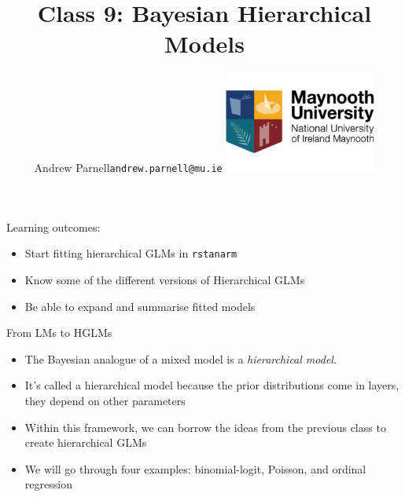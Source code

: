 \documentclass[ignorenonframetext,]{beamer}
\title{Class 9: Bayesian Hierarchical Models}
\author{Andrew Parnell\newline \texttt{andrew.parnell@mu.ie}
\newline \vspace{1cm} \newline \includegraphics[width=5cm]{MU_logo.jpg}}
\date{}
\providecommand{\tightlist}{%
  \setlength{\itemsep}{0pt}\setlength{\parskip}{0pt}}
\begin{document}
\frame{\titlepage}

\begin{frame}[fragile]{Learning outcomes:}

\begin{itemize}
\tightlist
\item
  Start fitting hierarchical GLMs in \texttt{rstanarm}
\item
  Know some of the different versions of Hierarchical GLMs
\item
  Be able to expand and summarise fitted models
\end{itemize}

\end{frame}

\begin{frame}{From LMs to HGLMs}

\begin{itemize}
\tightlist
\item
  The Bayesian analogue of a mixed model is a \emph{hierarchical model}.
\item
  It's called a hierarchical model because the prior distributions come
  in layers, they depend on other parameters
\item
  Within this framework, we can borrow the ideas from the previous class
  to create hierarchical GLMs
\item
  We will go through four examples: binomial-logit, Poisson, and ordinal
  regression
\end{itemize}

\end{frame}
\end{document}
